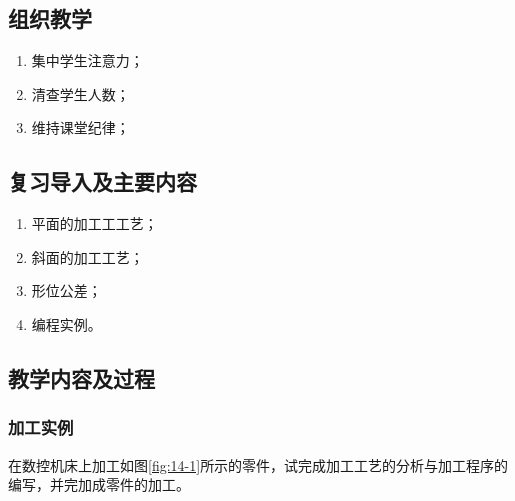 \jxhj{%
	}

\makeshouye %

\subsection{组织教学}
\begin{enumerate}[\hspace{2em}1、]
	\item 集中学生注意力；
	\item 清查学生人数；
	\item 维持课堂纪律；
\end{enumerate}

\subsection{复习导入及主要内容}
\begin{enumerate}[1、]
\item 平面的加工工工艺；
\item 斜面的加工工艺；
\item 形位公差；
\item 编程实例。
\end{enumerate}

\subsection{教学内容及过程}
\subsubsection{加工实例}
在数控机床上加工如图\ref{fig:14-1}所示的零件，试完成加工工艺的分析与加工程序的编写，并完加成零件的加工。

